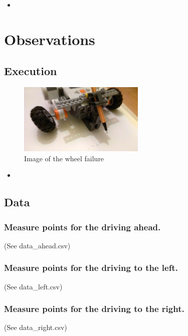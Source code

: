 \documentclass{scrartcl}
\begin{document}
\begin{itemize}
\item
\end{itemize}


\section{Observations}
\subsection{Execution}
\begin{figure}
 \center
 \includegraphics[width= 6cm]{img/wheel_failure.jpg}
 \caption{Image of the wheel failure}
 \label{fig:failure}
\end{figure}


\begin{itemize}
\item
\end{itemize}


\subsection{Data}
\subsubsection{Measure points for the driving ahead.}
 (See data\_ahead.csv)\\

\subsubsection{Measure points for the driving to the left.}
 (See data\_left.csv)\\

\subsubsection{Measure points for the driving to the right.}
 (See data\_right.csv)\\
\end{document}

